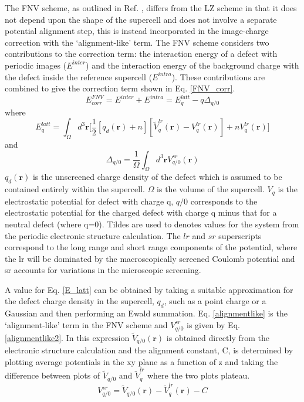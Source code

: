 \documentclass[11pt, twoside]{report}
\begin{document}
The FNV scheme, as outlined in Ref. , differs from the LZ scheme in that it does not depend upon the shape of the supercell and does not involve a separate potential alignment step, this is instead incorporated in the image-charge correction with the `alignment-like' term. The FNV scheme considers two contributions to the correction term: the interaction energy of a defect with periodic images ($E^{inter}$) and the interaction energy of the background charge with the defect inside the reference supercell ($E^{intra}$).
These contributions are combined to give the correction term shown in Eq. \ref{FNV_corr}.
\begin{equation}\label{FNV_corr}
E_{corr}^{FNV} = E^{inter} + E^{intra} = E^{latt}_q - q\Delta_{q/0}
\end{equation}
where
\begin{equation}\label{E_latt}
E^{latt}_q = \int_{\Omega} d^3 \mathbf{r} \Big[ \frac{1}{2} [q_d(\mathbf{r}) + n ] [\tilde{V}^{lr}_q(\mathbf{r}) - V^{lr}_q(\mathbf{r}) ] + nV^{lr}_q(\mathbf{r}) \Big]
\end{equation}
and
\begin{equation}\label{alignmentlike}
\Delta_{q/0} = \frac{1}{\Omega} \int_{\Omega} d^3 \mathbf{r} V^{sr}_{q/0}(\mathbf{r})
\end{equation}
$q_d(\mathbf{r})$ is the unscreened charge density of the defect which is assumed to be contained entirely within the supercell. $\Omega$ is the volume of the supercell. $V_{q}$ is the electrostatic potential for defect with charge q, $q/0$ corresponds to the electrostatic potential for the charged defect with charge q minus that for a neutral defect (where q=0). Tildes are used to denotes values for the system from the periodic electronic structure calculation. The $lr$ and $sr$ superscripts correspond to the long range and short range components of the potential, where the lr will be dominated by the macroscopically screened Coulomb potential and sr accounts for variations in the microscopic screening.

A value for Eq. \ref{E_latt} can be obtained by taking a suitable approximation for the defect charge density in the supercell, $q_d$, such as a point charge or a Gaussian and then performing an Ewald summation.
Eq. \ref{alignmentlike} is the `alignment-like' term in the FNV scheme and $V^{sr}_{q/0}$ is given by Eq. \ref{alignmentlike2}. In this expression $\tilde{V}_{q/0}(\mathbf{r})$ is obtained directly from the electronic structure calculation and the alignment constant, C, is determined by plotting average potentials in the xy plane as a function of z and taking the difference between plots of $\tilde{V}_{q/0}$ and $\tilde{V}^{lr}_{q}$ where the two plots plateau.
\begin{equation}\label{alignmentlike2}
V^{sr}_{q/0} =  \tilde{V}_{q/0}(\mathbf{r}) - \tilde{V}^{lr}_{q}(\mathbf{r}) - C 
\end{equation}
\end{document}
